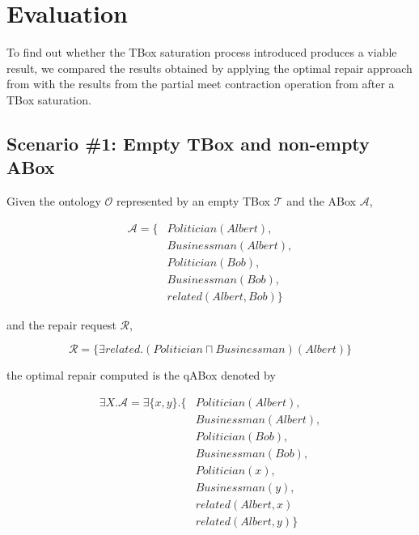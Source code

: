 
\chapter{Evaluation}
\label{chap:evaluation}

To find out whether the TBox saturation process introduced produces a viable result, we compared the results obtained by applying the optimal repair approach from \citep{Baader-CADE2021} with the results from the partial meet contraction operation from \citep{Matos2021} after a TBox saturation.

\section{Scenario \#1: Empty TBox and non-empty ABox}
\label{sec:scenario-1}

Given the ontology $\mathcal{O}$ represented by an empty TBox $\mathcal{T}$ and the ABox $\mathcal{A}$,

\begin{equation*}
    \begin{aligned}
        \mathcal{A} = \{ & Politician(Albert),  \\
                         & Businessman(Albert), \\
                         & Politician(Bob),     \\
                         & Businessman(Bob),    \\
                         & related(Albert, Bob) \}
    \end{aligned}
\end{equation*}

and the repair request $\mathcal{R}$,

$$\mathcal{R} = \{\exists related.(Politician \sqcap Businessman)(Albert) \}$$

the optimal repair computed is the qABox denoted by

\begin{equation*}
    \begin{aligned}
        \exists X.\mathcal{A} = \exists \{ x, y \}.\{ & Politician(Albert),  \\
                                                      & Businessman(Albert), \\
                                                      & Politician(Bob),     \\
                                                      & Businessman(Bob),    \\ 
                                                      & Politician(x),       \\
                                                      & Businessman(y),      \\
                                                      & related(Albert, x)   \\
                                                      & related(Albert, y)   \}
    \end{aligned}
\end{equation*}

